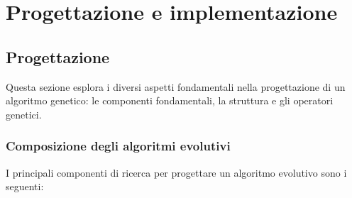 \chapter{Progettazione e implementazione}
\label{cap:progettazione-codifica}




\section{Progettazione}

Questa sezione esplora i diversi aspetti fondamentali nella progettazione di un algoritmo genetico: le componenti fondamentali, la struttura e gli operatori genetici.

\subsection{Composizione degli algoritmi evolutivi}

I principali componenti di ricerca per progettare un algoritmo evolutivo sono i seguenti:

